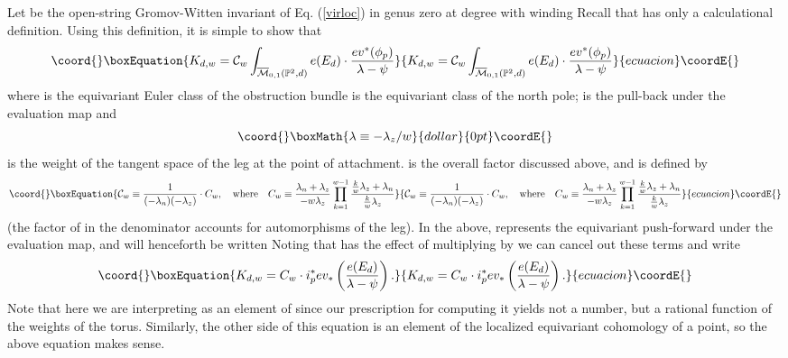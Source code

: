 \documentclass[a4paper,11pt]{article}
\providecommand{\PP}{{\mathbb{P}}}
\providecommand{\Q}{\mathbb{Q}}
\providecommand{\la}{\lambda}
\begin{document}
Let \coordHE{} be the open-string
Gromov-Witten invariant of Eq. \!\! (\ref{virloc})
in genus zero at degree \coordHE{} with winding \coordHE{}
Recall that \coordHE{} has only a calculational
definition.  Using this definition, it is simple to
show that
\begin{equation}\coord{}\boxEquation{
\label{gwdef}
K_{d,w} = {\mathcal C}_w \int_{\overline{\mathcal M}_{0,1}
({\mathbb P}^2,d)} e(E_d) \cdot
\frac{ev^*(\phi_p)}{\lambda-\psi}
}{
K_{d,w} = {\mathcal C}_w \int_{\overline{\mathcal M}_{0,1}
({\mathbb P}^2,d)} e(E_d) \cdot
\frac{ev^*(\phi_p)}{\lambda-\psi}
}{ecuacion}\coordE{}\end{equation}
where \coordHE{} is the equivariant Euler class of
the obstruction bundle \coordHE{}  \coordHE{} is the equivariant class of the
north pole;
\coordHE{} is the pull-back under the evaluation
map \myHighlight{$ev:  {\overline{\mathcal M}_{0,1}
({\mathbb P}^2,d)} \rightarrow \PP^2;$}\coordHE{}
and $$\coord{}\boxMath{\lambda \equiv -\lambda_z/w}{dollar}{0pt}\coordE{}$$
is the weight of the tangent space of the
leg at the point of attachment.  \coordHE{}
is the overall factor discussed above, and is
defined by
\begin{equation}\coord{}\boxEquation{
\label{Cw}
{\mathcal C}_{w} \equiv \frac{1}{(-\la_n)(-\la_z)}
\cdot
C_w,\quad {\rm where}
\quad C_w \equiv \frac{\la_n + \la_z}{-w\la_z}
\prod_{k=1}^{w-1}\frac{\frac{k}{w}\la_z + \la_n}{\frac{k}{w}\la_z}
}{
{\mathcal C}_{w} \equiv \frac{1}{(-\la_n)(-\la_z)}
\cdot
C_w,\quad {\rm where}
\quad C_w \equiv \frac{\la_n + \la_z}{-w\la_z}
\prod_{k=1}^{w-1}\frac{\frac{k}{w}\la_z + \la_n}{\frac{k}{w}\la_z}
}{ecuacion}\coordE{}\end{equation}
(the factor of \coordHE{} in the denominator accounts
for automorphisms of the leg).
In the above,
\coordHE{}
represents the equivariant push-forward under
the evaluation map, and
will henceforth be written \coordHE{}
Noting that \coordHE{} has the effect of
multiplying by \coordHE{}
we can cancel out these terms and write
\begin{equation}\coord{}\boxEquation{
\label{onepoint}K_{d,w} =
C_w \cdot i_p^*ev_{*}\left(
\frac{e(E_d)}{\lambda-\psi}\right).
}{
K_{d,w} =
C_w \cdot i_p^*ev_{*}\left(
\frac{e(E_d)}{\lambda-\psi}\right).
}{ecuacion}\coordE{}\end{equation}
Note that here we are interpreting \coordHE{} as an
element of \myHighlight{$\Q (\lambda_1,\lambda_2,\lambda_3)$}\coordHE{} since
our prescription for computing it yields not a number,
but a rational function of the weights of the torus.
Similarly, the other side of this equation is
an element of the localized equivariant cohomology
of a point, so the above equation makes sense.
\end{document}
